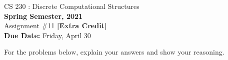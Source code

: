 \documentclass[11pt]{article}
\begin{document}
    \begin{center}
    {{\large CS 230 : Discrete Computational Structures}}
        \\


        {\bf Spring Semester, 2021}\\

        {\sc Assignment \#11} {\bf [Extra Credit]}\\
        {\bf Due Date:} Friday, April 30
    \end{center}

    For the problems below, explain your answers and show your reasoning.

\end{document}
